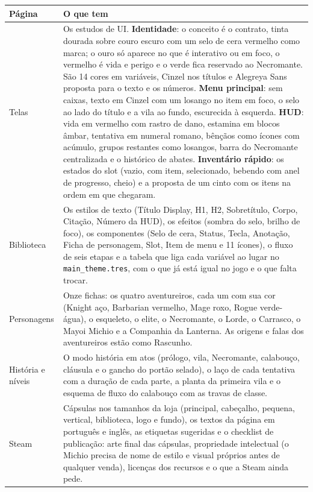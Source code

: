 \documentclass[11pt,a4paper]{article}
\begin{document}
\begin{xltabular}{\textwidth}{@{}lX@{}}
\toprule
\textbf{Página} & \textbf{O que tem} \\
\midrule
Telas & Os estudos de UI. \textbf{Identidade}: o conceito é o contrato, tinta dourada sobre couro escuro com um selo de cera vermelho como marca; o ouro só aparece no que é interativo ou em foco, o vermelho é vida e perigo e o verde fica reservado ao Necromante. São 14 cores em variáveis, Cinzel nos títulos e Alegreya Sans proposta para o texto e os números. \textbf{Menu principal}: sem caixas, texto em Cinzel com um losango no item em foco, o selo ao lado do título e a vila ao fundo, escurecida à esquerda. \textbf{HUD}: vida em vermelho com rastro de dano, estamina em blocos âmbar, tentativa em numeral romano, bênçãos como ícones com acúmulo, grupos restantes como losangos, barra do Necromante centralizada e o histórico de abates. \textbf{Inventário rápido}: os estados do slot (vazio, com item, selecionado, bebendo com anel de progresso, cheio) e a proposta de um cinto com os itens na ordem em que chegaram. \\
Biblioteca & Os estilos de texto (Título Display, H1, H2, Sobretítulo, Corpo, Citação, Número da HUD), os efeitos (sombra do selo, brilho de foco), os componentes (Selo de cera, Status, Tecla, Anotação, Ficha de personagem, Slot, Item de menu e 11 ícones), o fluxo de seis etapas e a tabela que liga cada variável ao lugar no \texttt{main\_theme.tres}, com o que já está igual no jogo e o que falta trocar. \\
Personagens & Onze fichas: os quatro aventureiros, cada um com sua cor (Knight aço, Barbarian vermelho, Mage roxo, Rogue verde-água), o esqueleto, o elite, o Necromante, o Lorde, o Carrasco, o Mayoi Michio e a Companhia da Lanterna. As origens e falas dos aventureiros estão como Rascunho. \\
História e níveis & O modo história em atos (prólogo, vila, Necromante, calabouço, cláusula e o gancho do portão selado), o laço de cada tentativa com a duração de cada parte, a planta da primeira vila e o esquema de fluxo do calabouço com as travas de classe. \\
Steam & Cápsulas nos tamanhos da loja (principal, cabeçalho, pequena, vertical, biblioteca, logo e fundo), os textos da página em português e inglês, as etiquetas sugeridas e o checklist de publicação: arte final das cápsulas, propriedade intelectual (o Michio precisa de nome de estilo e visual próprios antes de qualquer venda), licenças dos recursos e o que a Steam ainda pede. \\

\end{xltabular}
\end{document}
